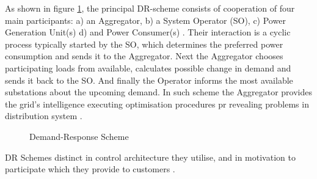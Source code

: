 As shown in figure \ref{fig:DR_scheme}, the principal DR-scheme consists of cooperation of four main participants: a) an Aggregator, b) a System Operator (SO), c) Power Generation Unit(s) d) and Power Consumer(s) \cite{Medina2010}. Their interaction is a cyclic process typically started by the SO, which determines the preferred power consumption and sends it to the Aggregator. Next the Aggregator chooses participating loads from available, calculates possible change in demand and sends it back to the SO. And finally the Operator informs the most available substations about the upcoming demand. In such scheme the Aggregator provides the grid's intelligence executing optimisation procedures pr revealing problems in distribution system \cite{Vardakas2015}. 

\begin{figure}
\centering
{}
    \caption{Demand-Response Scheme}
    \label{fig:DR_scheme}
\end{figure}

DR Schemes distinct in control architecture they utilise, and in motivation to participate which they provide to customers .

